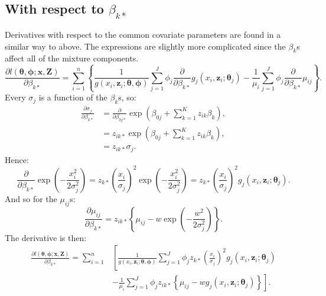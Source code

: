 \subsection{With respect to $\beta_{k*}$}

Derivatives with respect to the common covariate parameters are found in a similar way to above. The expressions are slightly more complicated since the $\beta_k$s affect all of the mixture components.
\begin{equation*}
\frac{\partial l(\bm{\theta},\bm{\phi}; \mathbf{x},\mathbf{Z})}{\partial \beta_{k*}} = \sum_{i=1}^n \left \{ \frac{1}{g(x_i,\mathbf{z}_i; \bm{\theta},\bm{\phi})} \sum_{j=1}^J \phi_j \frac{\partial}{\partial \beta_{k*}} g_j(x_i,\mathbf{z}_i; \bm{\theta}_j) - \frac{1}{\mu_i} \sum_{j=1}^J \phi_j \frac{\partial}{\partial \beta_{k*}}\mu_{ij}\right \}.
\end{equation*}
Every $\sigma_{j}$ is a function of the $\beta_{k}$s, so:
\begin{align*}
\frac{\partial \sigma_{j}}{\partial \beta_{k*}} &= \frac{\partial}{\partial \beta_{0j*}} \exp \left ( \beta_{0j} + \sum_{k=1}^K z_{ik} \beta_{k}\right ),\\
&= z_{ik*} \exp \left ( \beta_{0j} + \sum_{k=1}^K z_{ik} \beta_{k}\right ),\\
&= z_{ik*}\sigma_{j}.
\end{align*}
Hence:
\begin{equation*}
 \frac{\partial}{\partial \beta_{k*}} \exp\left ( -\frac{x_i^2}{2\sigma_{j}^2} \right ) = z_{k*} \left ( \frac{x_i}{\sigma_{j}}\right )^2 \exp \left (-\frac{x_i^2}{2 \sigma_{j}^2}\right ) = z_{k*} \left ( \frac{x_i}{\sigma_{j}}\right )^2 g_j(x_i,\mathbf{z}_i; \bm{\theta}_j).
 \label{detfct-deriv-k}
\end{equation*}
And so for the $\mu_{ij}$s:
\begin{equation*}
\frac{\partial \mu_{ij}}{\partial \beta_{k*}} = z_{ik*} \left \{ \mu_{ij} - w \exp\left ( -\frac{w^2}{2\sigma_{j}^2} \right ) \right \}.
\end{equation*}
The derivative is then:
\begin{align*}
\frac{\partial l(\bm{\theta},\bm{\phi}; \mathbf{x},\mathbf{Z})}{\partial \beta_{k*}} = \sum_{i=1}^n & \left [ \frac{1}{g(x_i,\mathbf{z}_i; \bm{\theta},\bm{\phi})} \sum_{j=1}^J \phi_j  z_{k*} \left ( \frac{x_i}{\sigma_{j}}\right )^2 g_j(x_i,\mathbf{z}_i; \bm{\theta}_j) \right. \\
& - \left. \frac{1}{\mu_i} \sum_{j=1}^J \phi_j z_{ik*} \left \{ \mu_{ij} - w g_j(x_i,\mathbf{z}_i; \bm{\theta}_j) \right \} \right ].
\end{align*}

